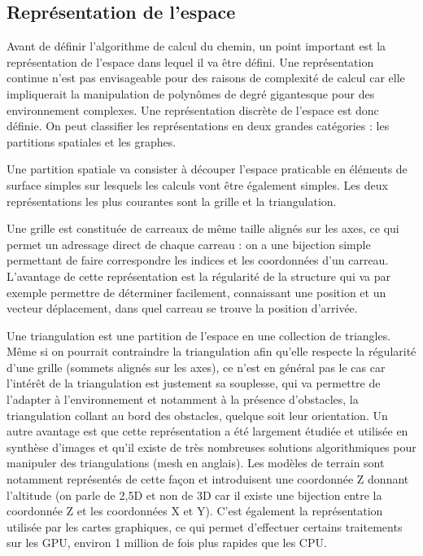 \documentclass{article}
\begin{document}
\subsection{Représentation de l’espace}
Avant de définir l’algorithme de calcul du chemin, un point important est la représentation de l’espace dans lequel il va être défini. Une représentation continue n’est pas envisageable pour des raisons de complexité de calcul car elle impliquerait la manipulation de polynômes de degré gigantesque pour des environnement complexes. Une représentation discrète de l’espace est donc définie. On peut classifier les représentations en deux grandes catégories : les partitions spatiales et les graphes.

Une partition spatiale va consister à découper l’espace praticable en éléments de surface simples sur lesquels les calculs vont être également simples. Les deux représentations les plus courantes sont la grille et la triangulation.

Une grille est constituée de carreaux de même taille alignés sur les axes, ce qui permet un adressage direct de chaque carreau : on a une bijection simple permettant de faire correspondre les indices et les coordonnées d’un carreau. L’avantage de cette représentation est la régularité de la structure qui va par exemple permettre de déterminer facilement, connaissant une position et un vecteur déplacement, dans quel carreau se trouve la position d’arrivée.

Une triangulation est une partition de l’espace en une collection de triangles. Même si on pourrait contraindre la triangulation afin qu’elle respecte la régularité d’une grille (sommets alignés sur les axes), ce n’est en général pas le cas car l’intérêt de la triangulation est justement sa souplesse, qui va permettre de l’adapter à l’environnement et notamment à la présence d’obstacles, la triangulation collant au bord des obstacles, quelque soit leur orientation. Un autre avantage est que cette représentation a été largement étudiée et utilisée en synthèse d’images et qu’il existe de très nombreuses solutions algorithmiques pour manipuler des triangulations (mesh en anglais). Les modèles de terrain sont notamment représentés de cette façon et introduisent une coordonnée Z donnant l’altitude (on parle de 2,5D et non de 3D car il existe une bijection entre la coordonnée Z et les coordonnées X et Y). C’est également la représentation utilisée par les cartes graphiques, ce qui permet d’effectuer certains traitements sur les GPU, environ 1 million de fois plus rapides que les CPU.
\end{document}
